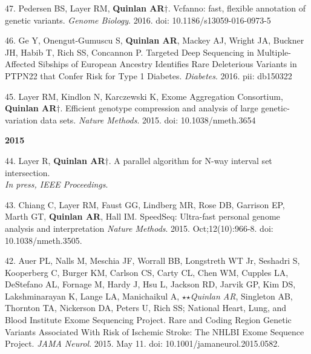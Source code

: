 \documentclass[margin,line]{cv}
\begin{document}
\begin{resume}
    \begin{list}{*}{}

    \item[47.] Pedersen BS, Layer RM, \textbf{Quinlan AR}$\dagger$.
    Vcfanno: fast, flexible annotation of genetic variants. \emph{Genome Biology}. 2016. doi: 10.1186/s13059-016-0973-5

    \item[46.] Ge Y, Onengut-Gumuscu S, \textbf{Quinlan AR}, Mackey AJ, Wright JA, Buckner JH, Habib T, Rich SS, Concannon P.
    Targeted Deep Sequencing in Multiple-Affected Sibships of European Ancestry Identifies Rare Deleterious Variants in PTPN22 that Confer Risk for Type 1 Diabetes. \emph{Diabetes}. 2016. pii: db150322

    \item[45.] Layer RM, Kindlon N, Karczewski K, Exome Aggregation Consortium, \textbf{Quinlan AR}$\dagger$.
    Efficient genotype compression and analysis of large genetic-variation data sets.
    \emph{Nature Methods}. 2015. doi: 10.1038/nmeth.3654

    \end{list}
    

    \textbf{2015} \\

    \begin{list}{*}{}

    \item[44.] Layer R, \textbf{Quinlan AR}$\dagger$.
    A parallel algorithm for N-way interval set intersection.\\
    \emph{In press, IEEE Proceedings}.

    \item[43.] Chiang C, Layer RM, Faust GG, Lindberg MR, Rose DB, Garrison EP, Marth GT, \textbf{Quinlan AR}, Hall IM.
    SpeedSeq: Ultra-fast personal genome analysis and interpretation
    \emph{Nature Methods}. 2015. Oct;12(10):966-8. doi: 10.1038/nmeth.3505.

    \item[42.] Auer PL, Nalls M, Meschia JF, Worrall BB, Longstreth WT Jr, Seshadri S, Kooperberg C, Burger KM, Carlson CS,
    Carty CL, Chen WM, Cupples LA, DeStefano AL, Fornage M, Hardy J, Hsu L, Jackson RD, Jarvik GP, Kim DS,
    Lakshminarayan K, Lange LA, Manichaikul A,  $\star$$\star$\textit{Quinlan AR}, Singleton AB, Thornton TA,
    Nickerson DA, Peters U, Rich SS; National Heart, Lung, and Blood Institute Exome Sequencing Project.
    Rare and Coding Region Genetic Variants Associated With Risk of Ischemic Stroke: The NHLBI Exome Sequence Project.
    \emph{JAMA Neurol}. 2015. May 11. doi: 10.1001/jamaneurol.2015.0582.


\end{list}
\end{resume}
\end{document}
